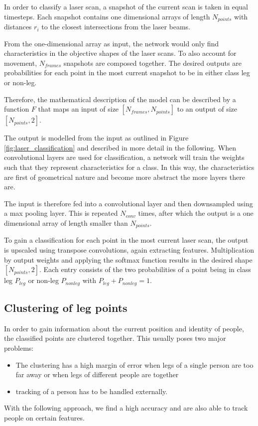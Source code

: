 In order to classify a laser scan, a snapshot of the current scan is taken in equal timesteps. Each snapshot contains one dimensional arrays of length $N_{points}$ with distances $r_i$ to the closest intersections from the laser beams.

From the one-dimensional array as input, the network would only find characteristics in the objective shapes of the laser scans. To also account for movement, $N_{frames}$ snapshots are composed together.
The desired outputs are probabilities for each point in the most current snapshot to be in either class leg or non-leg.

Therefore, the mathematical description of the model can be described by a function $F$ that maps an input of size $[N_{frames}, N_{points}]$ to an output of size $[N_{points}, 2]$.

The output is modelled from the input as outlined in Figure \ref{fig:laser_classification} and described in more detail in the following.
When convolutional layers are used for classification, a network will train the weights such that they represent characteristics for a class. In this way, the characteristics are first of geometrical nature and become more abstract the more layers there are.

The input is therefore fed into a convolutional layer and then downsampled using a max pooling layer. This is repeated $N_{conv}$ times, after which the output is a one dimensional array of length smaller than $N_{points}$.

To gain a classification for each point in the most current laser scan, the output is upscaled using transpose convolutions, again extracting features. Multiplication by output weights and applying the softmax function results in the desired shape $[N_{points}, 2]$. Each entry consists of the two probabilities of a point being in class leg $P_{leg}$ or non-leg $P_{nonleg}$ with $P_{leg} + P_{nonleg} = 1$.



\subsection{Clustering of leg points}
\label{subs:clustering}

In order to gain information about the current position and identity of people, the classified points are clustered together. This usually poses two major problems:
\begin{itemize}
\item The clustering has a high margin of error when legs of a single person are too far away or when legs of different people are together
\item tracking of a person has to be handled externally.
\end{itemize} 
With the following approach, we find a high accuracy and are also able to track people on certain features.

